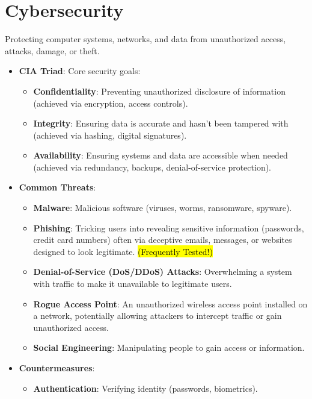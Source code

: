 \documentclass[11pt,oneside]{book}
\newcommand{\hlc}[2][hlyellow]{\sethlcolor{#1}\hl{#2}}
\begin{document}
\section{Cybersecurity}
\label{sec:cybersecurity}
Protecting computer systems, networks, and data from unauthorized access, attacks, damage, or theft.
\begin{itemize}
    \item \textbf{CIA Triad}: Core security goals:
        \begin{itemize}
            \item \textbf{Confidentiality}: Preventing unauthorized disclosure of information (achieved via encryption, access controls).
            \item \textbf{Integrity}: Ensuring data is accurate and hasn't been tampered with (achieved via hashing, digital signatures).
            \item \textbf{Availability}: Ensuring systems and data are accessible when needed (achieved via redundancy, backups, denial-of-service protection).
        \end{itemize}
    \item \textbf{Common Threats}:
        \begin{itemize}
            \item \textbf{Malware}: Malicious software (viruses, worms, ransomware, spyware).
            \item \textbf{Phishing}: Tricking users into revealing sensitive information (passwords, credit card numbers) often via deceptive emails, messages, or websites designed to look legitimate. \hlc[hlred]{(Frequently Tested!)}
            \item \textbf{Denial-of-Service (DoS/DDoS) Attacks}: Overwhelming a system with traffic to make it unavailable to legitimate users.
            \item \textbf{Rogue Access Point}: An unauthorized wireless access point installed on a network, potentially allowing attackers to intercept traffic or gain unauthorized access.
            \item \textbf{Social Engineering}: Manipulating people to gain access or information.
        \end{itemize}
    \item \textbf{Countermeasures}:
        \begin{itemize}
            \item \textbf{Authentication}: Verifying identity (passwords, biometrics).
                \begin{itemize}

\end{itemize}
\end{itemize}
\end{itemize}
\end{document}
